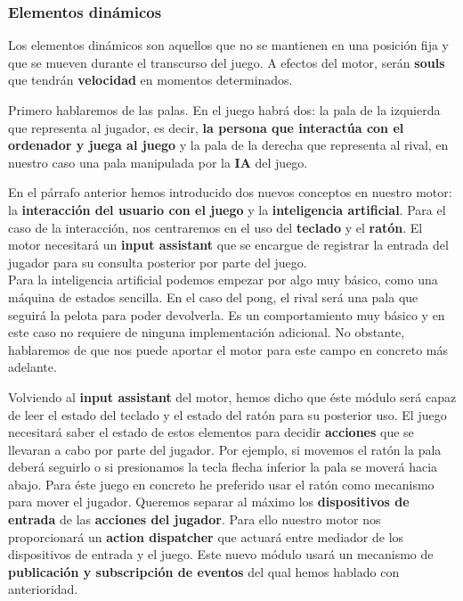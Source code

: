 \documentclass[a4paper]{article}
\begin{document}
\subsubsection{Elementos dinámicos}

Los elementos dinámicos son aquellos que no se mantienen en una posición fija y que se mueven durante el transcurso del juego. A efectos del motor, serán \textbf{souls} que tendrán \textbf{velocidad} en momentos determinados.

Primero hablaremos de las palas. En el juego habrá dos: la pala de la izquierda que representa al jugador, es decir, \textbf{la persona que interactúa con el ordenador y juega al juego} y la pala de la derecha que representa al rival, en nuestro caso una pala manipulada por la \textbf{IA} del juego.

En el párrafo anterior hemos introducido dos nuevos conceptos en nuestro motor: la \textbf{interacción del usuario con el juego} y la \textbf{inteligencia artificial}. Para el caso de la interacción, nos centraremos en el uso del \textbf{teclado} y el \textbf{ratón}. El motor necesitará un \textbf{input assistant} que se encargue de registrar la entrada del jugador para su consulta posterior por parte del juego. \\
Para la inteligencia artificial podemos empezar por algo muy básico, como una máquina de estados sencilla. En el caso del pong, el rival será una pala que seguirá la pelota para poder devolverla. Es un comportamiento muy básico y en este caso no requiere de ninguna implementación adicional. No obstante, hablaremos de que nos puede aportar el motor para este campo en concreto más adelante.

Volviendo al \textbf{input assistant} del motor, hemos dicho que éste módulo será capaz de leer el estado del teclado y el estado del ratón para su posterior uso. El juego necesitará saber el estado de estos elementos para decidir \textbf{acciones} que se llevaran a cabo por parte del jugador. Por ejemplo, si movemos el ratón la pala deberá seguirlo o si presionamos la tecla flecha inferior la pala se moverá hacia abajo. Para éste juego en concreto he preferido usar el ratón como mecanismo para mover el jugador. Queremos separar al máximo los \textbf{dispositivos de entrada} de las \textbf{acciones del jugador}. Para ello nuestro motor nos proporcionará un \textbf{action dispatcher} que actuará entre mediador de los dispositivos de entrada y el juego. Este nuevo módulo usará un mecanismo de \textbf{publicación y subscripción de eventos} del qual hemos hablado con anterioridad.
\end{document}

